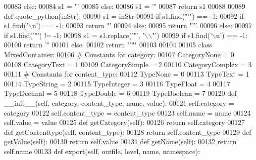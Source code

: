 \begin{DoxyCode}
{{{{{{{00083         \textcolor{keywordflow}{else}:
00084             s1 = \textcolor{stringliteral}{"'%
00085     \textcolor{keywordflow}{else}:
00086         s1 = \textcolor{stringliteral}{'"%
00087     \textcolor{keywordflow}{return} s1
00088 
00089 \textcolor{keyword}{def }quote_python(inStr):
00090     s1 = inStr
00091     \textcolor{keywordflow}{if} s1.find(\textcolor{stringliteral}{"'"}) == -1:
00092         \textcolor{keywordflow}{if} s1.find(\textcolor{stringliteral}{'\(\backslash\)n'}) == -1:
00093             \textcolor{keywordflow}{return} \textcolor{stringliteral}{"'%
00094         \textcolor{keywordflow}{else}:
00095             \textcolor{keywordflow}{return} \textcolor{stringliteral}{"'''%
00096     \textcolor{keywordflow}{else}:
00097         \textcolor{keywordflow}{if} s1.find(\textcolor{stringliteral}{'"'}) != -1:
00098             s1 = s1.replace(\textcolor{stringliteral}{'"'}, \textcolor{stringliteral}{'\(\backslash\)\(\backslash\)"'})
00099         \textcolor{keywordflow}{if} s1.find(\textcolor{stringliteral}{'\(\backslash\)n'}) == -1:
00100             \textcolor{keywordflow}{return} \textcolor{stringliteral}{'"%
00101         \textcolor{keywordflow}{else}:
00102             \textcolor{keywordflow}{return} \textcolor{stringliteral}{'"""%
00103 
00104 
00105 \textcolor{keyword}{class }MixedContainer:
00106     \textcolor{comment}{# Constants for category:}
00107     CategoryNone = 0
00108     CategoryText = 1
00109     CategorySimple = 2
00110     CategoryComplex = 3
00111     \textcolor{comment}{# Constants for content\_type:}
00112     TypeNone = 0
00113     TypeText = 1
00114     TypeString = 2
00115     TypeInteger = 3
00116     TypeFloat = 4
00117     TypeDecimal = 5
00118     TypeDouble = 6
00119     TypeBoolean = 7
00120     \textcolor{keyword}{def }__init__(self, category, content\_type, name, value):
00121         self.category = category
00122         self.content_type = content\_type
00123         self.name = name
00124         self.value = value
00125     \textcolor{keyword}{def }getCategory(self):
00126         \textcolor{keywordflow}{return} self.category
00127     \textcolor{keyword}{def }getContenttype(self, content\_type):
00128         \textcolor{keywordflow}{return} self.content_type
00129     \textcolor{keyword}{def }getValue(self):
00130         \textcolor{keywordflow}{return} self.value
00131     \textcolor{keyword}{def }getName(self):
00132         \textcolor{keywordflow}{return} self.name
00133     \textcolor{keyword}{def }export(self, outfile, level, name, namespace):
}}}}}}}}}}}}}
\end{DoxyCode}
